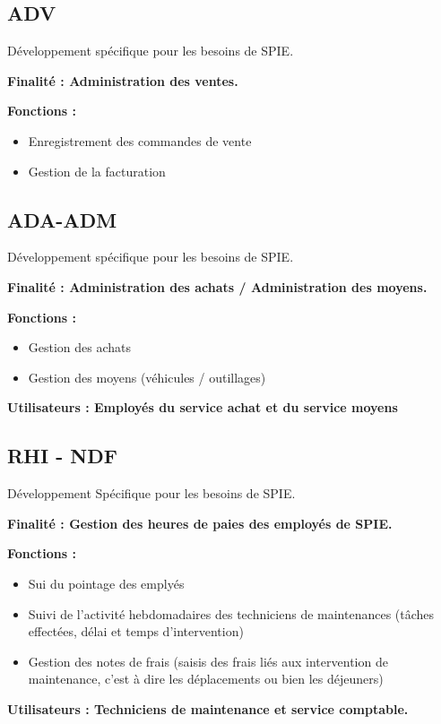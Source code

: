 \subsection{ADV}
Développement spécifique pour les besoins de SPIE.
\begin{description}
    \item \bf{Finalité :} Administration des ventes. \\
    \item \bf{Fonctions :}
    \begin{itemize}
        \item Enregistrement des commandes de vente
        \item Gestion de la facturation
    \end{itemize}
\end{description}

\subsection{ADA-ADM}
Développement spécifique pour les besoins de SPIE.
\begin{description}
    \item \bf{Finalité :} Administration des achats / Administration des moyens. \\
    \item \bf{Fonctions :}
    \begin{itemize}
        \item Gestion des achats
        \item Gestion des moyens (véhicules / outillages) \\
    \end{itemize}
    \item \bf{Utilisateurs :} Employés du service achat et du service moyens
\end{description}

\subsection{RHI - NDF}
Développement Spécifique pour les besoins de SPIE.
\begin{description}
    \item \bf{Finalité :} Gestion des heures de paies des employés de SPIE. \\
    \item \bf{Fonctions :}
    \begin{itemize}
        \item Sui du pointage des emplyés
        \item Suivi de l’activité hebdomadaires des techniciens de maintenances (tâches effectées, délai et temps d’intervention)
        \item Gestion des notes de frais (saisis des frais liés aux intervention de maintenance, c’est à dire les déplacements ou bien les déjeuners) \\
    \end{itemize}
    \item \bf{Utilisateurs :} Techniciens de maintenance et service comptable. \\
\end{description}

